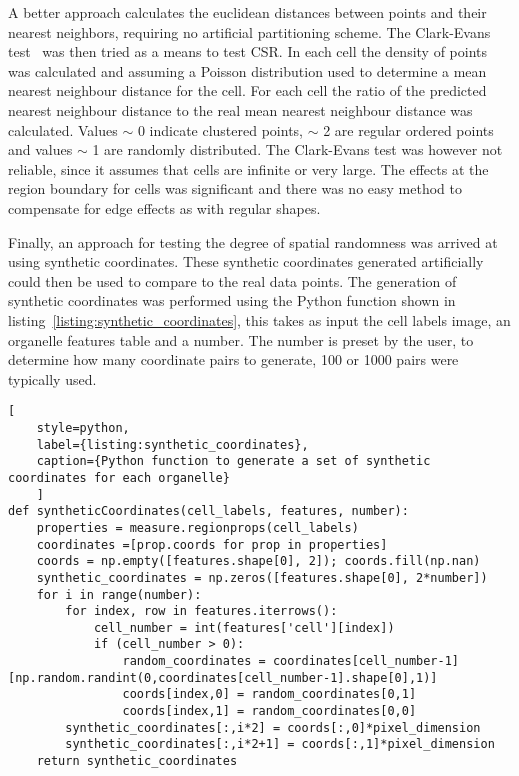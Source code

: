 A better approach calculates the euclidean distances between points and their nearest neighbors, requiring no artificial partitioning scheme. The Clark-Evans test~\cite{Clark1954} was then tried as a means to test CSR. In each cell the density of points was calculated and assuming a Poisson distribution used to determine a mean nearest neighbour distance for the cell. For each cell the ratio of the predicted nearest neighbour distance to the real mean nearest neighbour distance was calculated. Values $\sim$ 0 indicate clustered points, $\sim$ 2 are regular ordered points and values $\sim$ 1 are randomly distributed. The Clark-Evans test was however not reliable, since it assumes that cells are infinite or very large. The effects at the region boundary for cells was significant and there was no easy method to compensate for edge effects as with regular shapes.

Finally, an approach for testing the degree of spatial randomness was arrived at using synthetic coordinates. These synthetic coordinates generated artificially could then be used to compare to the real data points. The generation of synthetic coordinates was performed using the Python function shown in listing~\ref{listing:synthetic_coordinates}, this takes as input the cell labels image, an organelle features table and a number. The number is preset by the user, to determine how many coordinate pairs to generate, 100 or 1000 pairs were typically used.

\begin{lstlisting}[
	style=python,
	label={listing:synthetic_coordinates},
	caption={Python function to generate a set of synthetic coordinates for each organelle}
	]
def syntheticCoordinates(cell_labels, features, number):
    properties = measure.regionprops(cell_labels)
    coordinates =[prop.coords for prop in properties] 
    coords = np.empty([features.shape[0], 2]); coords.fill(np.nan)
    synthetic_coordinates = np.zeros([features.shape[0], 2*number])
    for i in range(number):
        for index, row in features.iterrows():
            cell_number = int(features['cell'][index])
            if (cell_number > 0):
                random_coordinates = coordinates[cell_number-1][np.random.randint(0,coordinates[cell_number-1].shape[0],1)]
                coords[index,0] = random_coordinates[0,1]
                coords[index,1] = random_coordinates[0,0]
        synthetic_coordinates[:,i*2] = coords[:,0]*pixel_dimension
        synthetic_coordinates[:,i*2+1] = coords[:,1]*pixel_dimension
    return synthetic_coordinates
\end{lstlisting}

